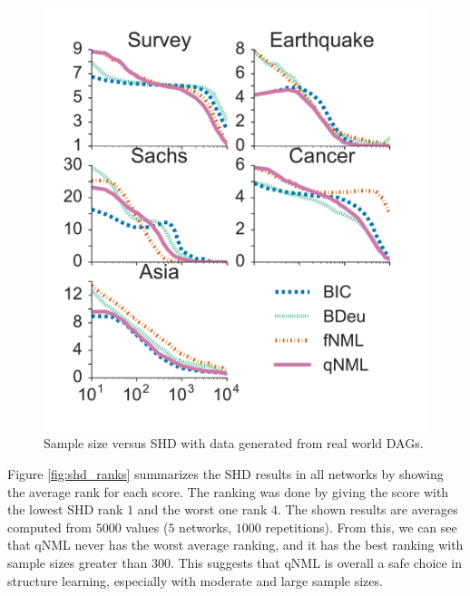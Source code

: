 \begin{figure}[h]
\centering
\includegraphics[width=\columnwidth]{qNML_images/shd_all.pdf}
\caption{Sample size versus SHD with data generated from real world DAGs.}
\label{fig:all_shd}
\end{figure}

Figure \ref{fig:shd_ranks} summarizes the SHD results in all networks by showing the average rank for each score. The ranking was done by giving the score with the lowest SHD rank $1$ and the worst one rank $4$. The shown results are averages computed from $5000$ values ($5$ networks, $1000$ repetitions). From this, we can see that qNML never has the worst average ranking, and it has the best ranking with sample sizes greater than $300$. This suggests that qNML is overall a safe choice in structure learning, especially with moderate and large sample sizes.

